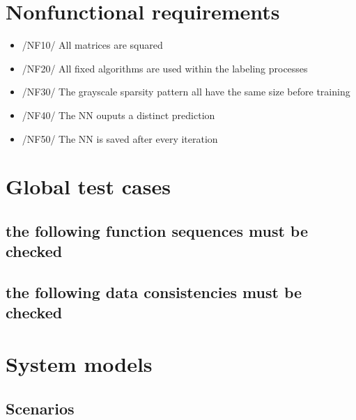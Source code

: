 \documentclass[parskip=full]{scrartcl}
\begin{document}
\section{Nonfunctional requirements}
	\begin{itemize}
		\item /NF10/ All matrices are squared
		\item /NF20/ All fixed algorithms are used within the labeling processes
		\item /NF30/ The grayscale sparsity pattern all have the same size before training
		\item /NF40/ The NN ouputs a distinct prediction
		\item /NF50/ The NN is saved after every iteration
	\end{itemize}
	

\section{Global test cases}
\subsection{the following function sequences must be checked}
\subsection{the following data consistencies must be checked}
\newpage
\section{System models}
\subsection{Scenarios}
\end{document}
